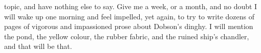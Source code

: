 topic, and have nothing else to say. Give me a week, or a month, and no doubt I will wake up one morning and feel impelled, yet again, to try to write dozens of pages of vigorous and impassioned prose about Dobson's dinghy. I will mention the pond, the yellow colour, the rubber fabric, and the ruined ship's chandler, and that will be that.